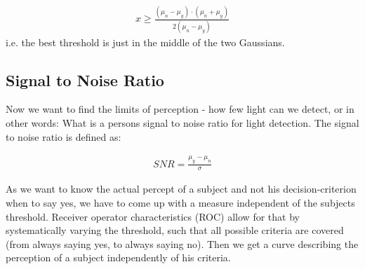 \begin{align*}
  x \geq \frac{\left(\mu_n-\mu_y\right)\cdot \left(\mu_n+\mu_y\right)}{2\left(\mu_n-\mu_y\right)}
\end{align*}
i.e. the best threshold is just in the middle of the two Gaussians.

\subsection{Signal to Noise Ratio}

Now we want to find the limits of perception - how few light can we detect, or in other words: What is a persons signal to noise ratio for light detection.
The signal to noise ratio is defined as:

\begin{align*}
SNR = \frac{\mu_y-\mu_n}{\sigma}  
\end{align*} 

As we want to know the actual percept of a subject and not his decision-criterion when to say yes, we have to come up with a measure independent of the subjects threshold.
Receiver operator characteristics (ROC) allow for that by systematically varying the threshold, such that all possible criteria are covered (from always saying yes, to always saying no). Then we get a curve describing the perception of a subject independently of his criteria.


